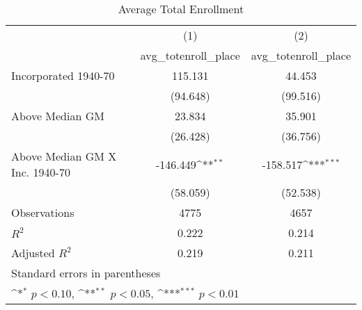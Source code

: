 \begin{table}[htbp]\centering
\def\sym#1{\ifmmode^{#1}\else\(^{#1}\)\fi}
\caption{Average Total Enrollment}
\begin{tabular}{l*{2}{c}}
\hline\hline
                    &\multicolumn{1}{c}{(1)}&\multicolumn{1}{c}{(2)}\\
                    &\multicolumn{1}{c}{avg\_totenroll\_place}&\multicolumn{1}{c}{avg\_totenroll\_place}\\
\hline
Incorporated 1940-70&     115.131         &      44.453         \\
                    &    (94.648)         &    (99.516)         \\
[1em]
Above Median GM     &      23.834         &      35.901         \\
                    &    (26.428)         &    (36.756)         \\
[1em]
Above Median GM X Inc. 1940-70&    -146.449\sym{**} &    -158.517\sym{***}\\
                    &    (58.059)         &    (52.538)         \\
\hline
Observations        &        4775         &        4657         \\
\(R^{2}\)           &       0.222         &       0.214         \\
Adjusted \(R^{2}\)  &       0.219         &       0.211         \\
\hline\hline
\multicolumn{3}{l}{\footnotesize Standard errors in parentheses}\\
\multicolumn{3}{l}{\footnotesize \sym{*} \(p<0.10\), \sym{**} \(p<0.05\), \sym{***} \(p<0.01\)}\\
\end{tabular}
\end{table}
